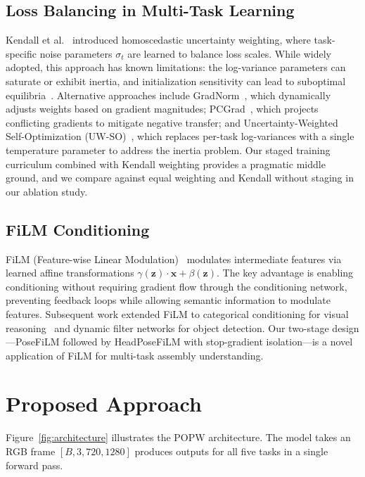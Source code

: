\documentclass[10pt,twocolumn]{article}
\newcommand{\popw}{POPW}
\begin{document}
\subsection{Loss Balancing in Multi-Task Learning}

Kendall et al.~\cite{kendall2018multi} introduced homoscedastic uncertainty weighting, where task-specific noise parameters $\sigma_t$ are learned to balance loss scales. While widely adopted, this approach has known limitations: the log-variance parameters can saturate or exhibit inertia, and initialization sensitivity can lead to suboptimal equilibria~\cite{guo2025beyond}. Alternative approaches include GradNorm~\cite{chen2018gradnorm}, which dynamically adjusts weights based on gradient magnitudes; PCGrad~\cite{yu2020pcgrad}, which projects conflicting gradients to mitigate negative transfer; and Uncertainty-Weighted Self-Optimization (UW-SO)~\cite{gong2025uwso}, which replaces per-task log-variances with a single temperature parameter to address the inertia problem. Our staged training curriculum combined with Kendall weighting provides a pragmatic middle ground, and we compare against equal weighting and Kendall without staging in our ablation study.

\subsection{FiLM Conditioning}

FiLM (Feature-wise Linear Modulation)~\cite{dumoulin2016learned,perez2018film} modulates intermediate features via learned affine transformations $\gamma(\mathbf{z}) \cdot \mathbf{x} + \beta(\mathbf{z})$. The key advantage is enabling conditioning without requiring gradient flow through the conditioning network, preventing feedback loops while allowing semantic information to modulate features. Subsequent work extended FiLM to categorical conditioning for visual reasoning~\cite{park2019catfilm} and dynamic filter networks for object detection. Our two-stage design---PoseFiLM followed by HeadPoseFiLM with stop-gradient isolation---is a novel application of FiLM for multi-task assembly understanding.

\section{Proposed Approach}
\label{sec:method}

Figure~\ref{fig:architecture} illustrates the \popw{} architecture. The model takes an RGB frame $[B, 3, 720, 1280]$ produces outputs for all five tasks in a single forward pass.
\end{document}
